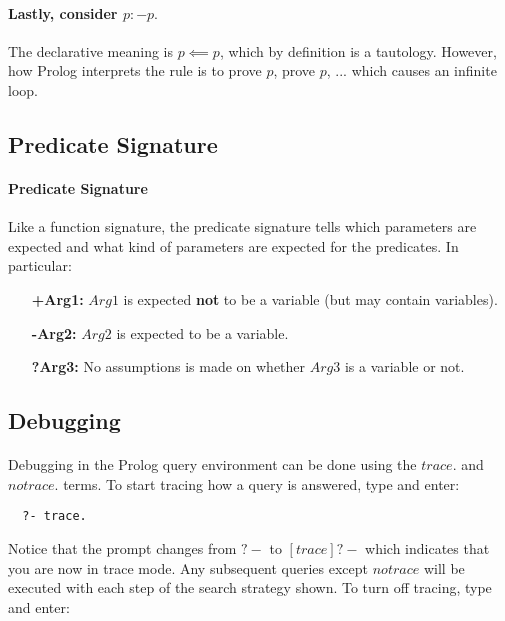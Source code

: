 \documentclass{article}
\begin{document}
\begin{multicols}{2}
  \paragraph{Lastly, consider $p :- p.$} The declarative meaning is $p \impliedby p$, which by definition is a tautology. However, how Prolog interprets the rule is to prove $p$, prove $p$, ...  which causes an infinite loop.
  
  \subsection{Predicate Signature}
  
  \paragraph{Predicate Signature} Like a function signature, the predicate signature tells which parameters are expected and what kind of parameters are expected for the predicates. In particular:
  
  \begin{enumerate}
  \item[\bf +Arg1:] $Arg1$ is expected {\bf not} to be a variable (but may contain variables).
  \item[\bf -Arg2:] $Arg2$ is expected to be a variable.
  \item[\bf ?Arg3:] No assumptions is made on whether $Arg3$ is a variable or not.
  \end{enumerate}
  
  \subsection{Debugging}
  
  \paragraph{} Debugging in the Prolog query environment can be done using the $trace.$ and $notrace.$ terms. To start tracing how a query is answered, type and enter:
  
  \begin{lstlisting}
  ?- trace.
  \end{lstlisting}
  
  Notice that the prompt changes from $?-$ to $[trace]  ?-$ which indicates that you are now in trace mode. Any subsequent queries except $notrace$ will be executed with each step of the search strategy shown. To turn off tracing, type and enter:
  

\end{multicols}
\end{document}
